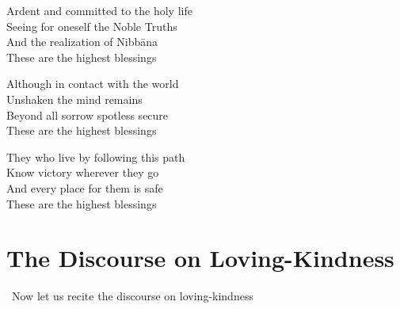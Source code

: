 \ifbfive\enlargethispage{1\baselineskip}\fi

\ifafive\clearpage\fi

\begin{english-only}
  Ardent and committed \ifdigital\makeatletter\hyperlink{endnote48-appendix}\makeatother \thinspace\fi to the holy life\\
  Seeing for oneself the Noble Truths\\
  And the realization of Nibbāna\\
  These are the highest blessings
\end{english-only}

\begin{english-only}
  Although in contact with the world\\
  Unshaken the mind remains\\
  Beyond all sorrow spotless secure\\
  These are the highest blessings
\end{english-only}

\begin{english-only}
  They who live by following this path\\
  Know victory wherever they go\\
  And every place for them is safe\\
  These are the highest blessings
\end{english-only}

\suttaRef{[Snp 2.4]}

\ifdigital{}\fi



\section{The Discourse on Loving-Kindness}
\label{words-on-loving-kindness}

\begin{leader-english}
  \anglebracketleft\ \hspace{-0.5mm}Now let us recite the discourse on loving-kindness \hspace{-0.5mm}\anglebracketright\
\end{leader-english}

